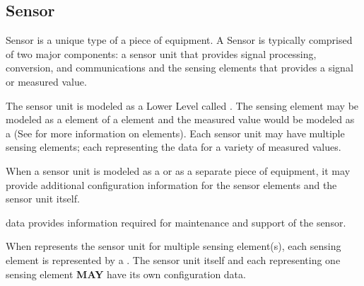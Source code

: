 \subsection{Sensor} 


\gls{Sensor} is a unique type of a piece of equipment.  A \gls{Sensor} is typically comprised of two major components: a \gls{sensor unit} that provides signal processing, conversion, and communications and the \glspl{sensing element} that provides a signal or measured value.

The \gls{sensor unit} is modeled as a \gls{Lower Level}  called .  The \gls{sensing element} may be modeled as a  element of a  element and the measured value would be modeled as a  (See  for more information on  elements).  Each \gls{sensor unit} may have multiple \glspl{sensing element}; each representing the data for a variety of measured values.

When a \gls{sensor unit} is modeled as a  or as a separate piece of equipment, it may provide additional configuration information for the \glspl{sensor element} and the \gls{sensor unit} itself.  

 data provides information required for maintenance and support of the sensor.

When  represents the \gls{sensor unit} for multiple \gls{sensing element}(s), each sensing element is represented by a .   The \gls{sensor unit} itself and each  representing one \gls{sensing element} \textbf{MAY} have its own configuration data.

